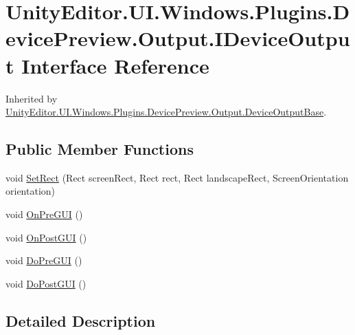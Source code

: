 \hypertarget{interface_unity_editor_1_1_u_i_1_1_windows_1_1_plugins_1_1_device_preview_1_1_output_1_1_i_device_output}{}\section{Unity\+Editor.\+U\+I.\+Windows.\+Plugins.\+Device\+Preview.\+Output.\+I\+Device\+Output Interface Reference}
\label{interface_unity_editor_1_1_u_i_1_1_windows_1_1_plugins_1_1_device_preview_1_1_output_1_1_i_device_output}


Inherited by \hyperlink{class_unity_editor_1_1_u_i_1_1_windows_1_1_plugins_1_1_device_preview_1_1_output_1_1_device_output_base}{Unity\+Editor.\+U\+I.\+Windows.\+Plugins.\+Device\+Preview.\+Output.\+Device\+Output\+Base}.

\subsection*{Public Member Functions}
\begin{DoxyCompactItemize}
\item 
void \hyperlink{interface_unity_editor_1_1_u_i_1_1_windows_1_1_plugins_1_1_device_preview_1_1_output_1_1_i_device_output_a11d9dc3382eea632ec158a710433e1a9}{Set\+Rect} (Rect screen\+Rect, Rect rect, Rect landscape\+Rect, Screen\+Orientation orientation)
\item 
void \hyperlink{interface_unity_editor_1_1_u_i_1_1_windows_1_1_plugins_1_1_device_preview_1_1_output_1_1_i_device_output_ae571de06d47cda97afdeedd59ddf5657}{On\+Pre\+G\+U\+I} ()
\item 
void \hyperlink{interface_unity_editor_1_1_u_i_1_1_windows_1_1_plugins_1_1_device_preview_1_1_output_1_1_i_device_output_a2a9d42770a2fd94a917d7f9cd02ec0e7}{On\+Post\+G\+U\+I} ()
\item 
void \hyperlink{interface_unity_editor_1_1_u_i_1_1_windows_1_1_plugins_1_1_device_preview_1_1_output_1_1_i_device_output_a7b117274d58ab3c9ca2e7e74753a17cb}{Do\+Pre\+G\+U\+I} ()
\item 
void \hyperlink{interface_unity_editor_1_1_u_i_1_1_windows_1_1_plugins_1_1_device_preview_1_1_output_1_1_i_device_output_a1a429516fb13945fec4ed62b4da63cc5}{Do\+Post\+G\+U\+I} ()
\end{DoxyCompactItemize}


\subsection{Detailed Description}


